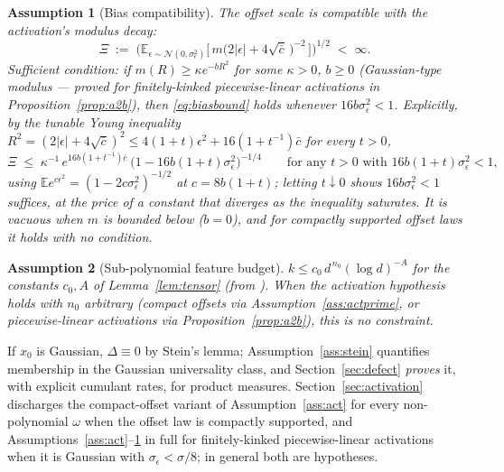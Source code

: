 \documentclass[11pt]{article}
\newtheorem{assumption}{Assumption}
\theoremstyle{remark}
\newcommand{\E}{\mathbb{E}}
\begin{document}
\begin{assumption}[Bias compatibility]\label{ass:bias}
The offset scale is compatible with the activation's modulus decay:
\begin{equation}\label{eq:biasbound}
\Xi \;:=\; \Big(\E_{\epsilon\sim\mathcal N(0,\sigma_\epsilon^2)}\Big[\, m\big(2|\epsilon| + 4\sqrt{\bar c}\,\big)^{-2}\,\Big]\Big)^{1/2} \;<\; \infty .
\end{equation}
Sufficient condition: if $m(R) \ge \kappa e^{-bR^2}$ for some $\kappa > 0$, $b \ge 0$ (Gaussian-type modulus --- proved for finitely-kinked piecewise-linear activations in Proposition~\ref{prop:a2b}), then \eqref{eq:biasbound} holds whenever $16b\sigma_\epsilon^2 < 1$. Explicitly, by the tunable Young inequality $R^2 = (2|\epsilon| + 4\sqrt{\bar c})^2 \le 4(1+t)\epsilon^2 + 16(1+t^{-1})\bar c$ for every $t > 0$,
\[
\Xi \;\le\; \kappa^{-1}\,e^{16b(1+t^{-1})\bar c}\ \big(1 - 16b(1+t)\sigma_\epsilon^2\big)^{-1/4}
\qquad \text{for any } t > 0 \text{ with } 16b(1+t)\sigma_\epsilon^2 < 1,
\]
using $\E e^{c\epsilon^2} = (1-2c\sigma_\epsilon^2)^{-1/2}$ at $c = 8b(1+t)$; letting $t \downarrow 0$ shows $16b\sigma_\epsilon^2 < 1$ suffices, at the price of a constant that diverges as the inequality saturates. It is vacuous when $m$ is bounded below ($b=0$), and for compactly supported offset laws it holds with no condition.
\end{assumption}

\begin{assumption}[Sub-polynomial feature budget]\label{ass:budget}
$k \le c_0\, d^{\,n_0} (\log d)^{-A}$ for the constants $c_0, A$ of Lemma~\ref{lem:tensor} (from \cite{MMM21,MZ22}). When the activation hypothesis holds with $n_0$ arbitrary (compact offsets via Assumption~\ref{ass:actprime}, or piecewise-linear activations via Proposition~\ref{prop:a2b}), this is no constraint.
\end{assumption}

If $x_0$ is Gaussian, $\Delta \equiv 0$ by Stein's lemma; Assumption~\ref{ass:stein} quantifies membership in the Gaussian universality class, and Section~\ref{sec:defect} \emph{proves} it, with explicit cumulant rates, for product measures. Section~\ref{sec:activation} discharges the compact-offset variant of Assumption~\ref{ass:act} for every non-polynomial $\omega$ when the offset law is compactly supported, and Assumptions~\ref{ass:act}--\ref{ass:bias} in full for finitely-kinked piecewise-linear activations when it is Gaussian with $\sigma_\epsilon < \sigma/8$; in general both are hypotheses.
\end{document}
